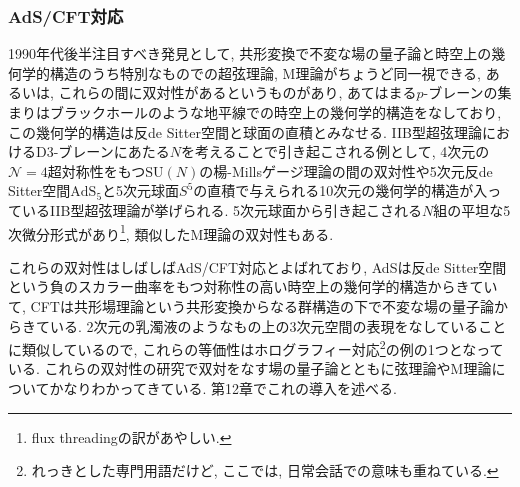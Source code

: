 \documentclass[10pt,a4paper]{jsarticle}
\begin{document}
\subsubsection*{AdS/CFT対応}
1990年代後半注目すべき発見として, 共形変換で不変な場の量子論と時空上の幾何学的構造のうち特別なものでの超弦理論, M理論がちょうど同一視できる, あるいは, これらの間に双対性があるというものがあり, あてはまる$p$-ブレーンの集まりはブラックホールのような地平線での時空上の幾何学的構造をなしており, この幾何学的構造は反de Sitter空間と球面の直積とみなせる. IIB型超弦理論におけるD3-ブレーンにあたる$N$を考えることで引き起こされる例として, 4次元の$\mathcal{N} = 4$超対称性をもつ$\mathrm{SU} \left( N \right) $の楊-Millsゲージ理論の間の双対性や5次元反de Sitter空間$\mathrm{AdS}_5 $と5次元球面$S^5 $の直積で与えられる10次元の幾何学的構造が入っているIIB型超弦理論が挙げられる. 5次元球面から引き起こされる$N$組の平坦な5次微分形式があり\footnote{flux threadingの訳があやしい. }, 類似したM理論の双対性もある. \par
これらの双対性はしばしばAdS/CFT対応とよばれており, AdSは反de Sitter空間という負のスカラー曲率をもつ対称性の高い時空上の幾何学的構造からきていて, CFTは共形場理論という共形変換からなる群構造の下で不変な場の量子論からきている. 2次元の乳濁液のようなもの上の3次元空間の表現をなしていることに類似しているので, これらの等価性はホログラフィー対応\footnote{れっきとした専門用語だけど, ここでは, 日常会話での意味も重ねている. }の例の1つとなっている. これらの双対性の研究で双対をなす場の量子論とともに弦理論やM理論についてかなりわかってきている. 第12章でこれの導入を述べる. 
\end{document}
